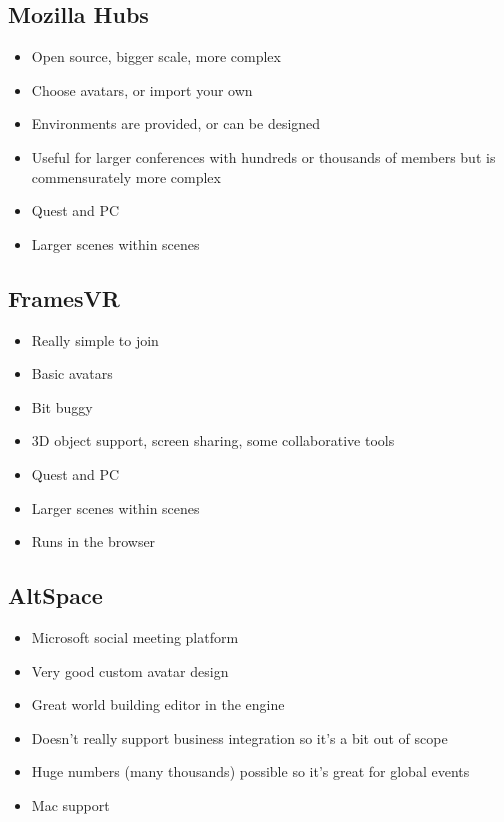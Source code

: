 \subsection{Mozilla Hubs}
\begin{itemize}
\item Open source, bigger scale, more complex
\item Choose avatars, or import your own
\item Environments are provided, or can be designed
\item Useful for larger conferences with hundreds or thousands of members but is commensurately more complex
\item Quest and PC
\item Larger scenes within scenes
\end{itemize}
\subsection{FramesVR}
\begin{itemize}
\item Really simple to join
\item Basic avatars
\item Bit buggy
\item 3D object support, screen sharing, some collaborative tools
\item Quest and PC
\item Larger scenes within scenes
\item Runs in the browser
\end{itemize}
\subsection{AltSpace}
\begin{itemize}
\item Microsoft social meeting platform
\item Very good custom avatar design
\item Great world building editor in the engine
\item Doesn't really support business integration so it's a bit out of scope
\item Huge numbers (many thousands) possible so it's great for global events
\item Mac support
\end{itemize}
